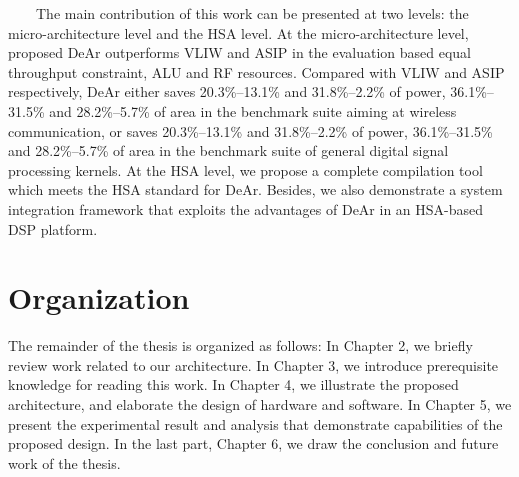         \ \ \ \ The main contribution of this work can be presented at two levels: the micro-architecture level and the HSA level. 
        At the micro-architecture level, proposed DeAr outperforms VLIW and ASIP in the evaluation based equal throughput constraint, ALU and RF resources.
        Compared with VLIW and ASIP respectively, DeAr either saves 20.3\%--13.1\% and 31.8\%--2.2\% of power, 36.1\%--31.5\% and 28.2\%--5.7\% of area in the benchmark suite aiming at wireless communication, 
        or saves 20.3\%--13.1\% and 31.8\%--2.2\% of power, 36.1\%--31.5\% and 28.2\%--5.7\% of area in the benchmark suite of general digital signal processing kernels.
        At the HSA level, we propose a complete compilation tool which meets the HSA standard for DeAr.
        Besides, we also demonstrate a system integration framework that exploits the advantages of DeAr in an HSA-based DSP platform.
    \section{Organization}
    The remainder of the thesis is organized as follows: In Chapter 2, we briefly review work related to our architecture. In Chapter 3, we introduce prerequisite knowledge for reading this work. In Chapter 4, we illustrate the proposed architecture, and elaborate the design of hardware and software. In Chapter 5, we present the experimental result and analysis that demonstrate capabilities of the proposed design. In the last part, Chapter 6, we draw the conclusion and future work of the thesis.


